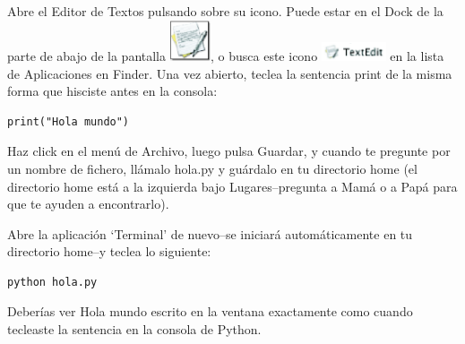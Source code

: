 \begin{MAC}
Abre el Editor de Textos pulsando sobre su icono. Puede estar en el Dock de la parte de abajo de la pantalla \includegraphics*[width=12mm]{textedit-icon.eps}, o busca este icono \includegraphics*[width=19mm]{textedit-icon2.eps} en la lista de Aplicaciones en Finder.  Una vez abierto, teclea la sentencia print de la misma forma que hisciste antes en la consola:

\begin{listing}
\begin{verbatim}
print("Hola mundo")
\end{verbatim}
\end{listing}

Haz click en el menú de Archivo, luego pulsa Guardar, y cuando te pregunte por un nombre de fichero, llámalo hola.py y guárdalo en tu directorio home (el directorio home está a la izquierda bajo Lugares--pregunta a Mamá o a Papá para que te ayuden a encontrarlo).

Abre la aplicación `Terminal' de nuevo--se iniciará automáticamente en tu directorio home--y teclea lo siguiente:

\begin{listing}
\begin{verbatim}
python hola.py
\end{verbatim}
\end{listing}

Deberías ver Hola mundo escrito en la ventana exactamente como cuando tecleaste la sentencia en la consola de Python.

\end{MAC}

